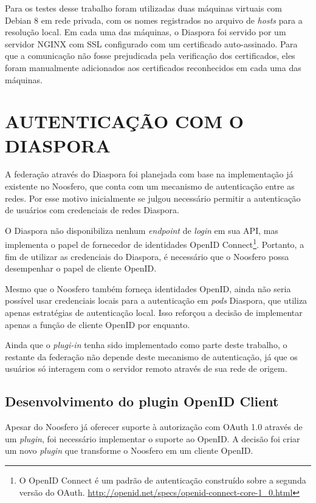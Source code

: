 \begin{apendicesenv}
Para os testes desse trabalho foram utilizadas duas máquinas virtuais com Debian 8
em rede privada, com os nomes registrados no arquivo de \textit{hosts} para a
resolução local. Em cada uma das máquinas, o Diaspora foi servido por um servidor
NGINX com SSL configurado com um certificado auto-assinado. Para que a comunicação
não fosse prejudicada pela verificação dos certificados, eles foram manualmente
adicionados aos certificados reconhecidos em cada uma das máquinas.

\section{AUTENTICAÇÃO COM O DIASPORA}

A federação através do Diaspora foi planejada com base na implementação já existente
no Noosfero, que conta com um mecanismo de autenticação entre as redes. Por esse
motivo inicialmente se julgou necessário permitir a autenticação de usuários com
credenciais de redes Diaspora.

O Diaspora não disponibiliza nenhum \textit{endpoint} de \textit{login} em sua API,
mas implementa o papel de fornecedor de identidades OpenID Connect\footnote{O OpenID
Connect é um padrão de autenticação construído sobre a segunda versão do OAuth.
\url{http://openid.net/specs/openid-connect-core-1_0.html}}. Portanto, a fim de
utilizar as credenciais do Diaspora, é necessário que o Noosfero possa desempenhar o
papel de cliente OpenID.

Mesmo que o Noosfero também forneça identidades OpenID, ainda não seria possível
usar credenciais locais para a autenticação em \textit{pods} Diaspora, que utiliza
apenas estratégias de autenticação local. Isso reforçou a decisão de implementar
apenas a função de cliente OpenID por enquanto.

Ainda que o \textit{plugi-in} tenha sido implementado como parte deste trabalho, o
restante da federação não depende deste mecanismo de autenticação, já que os
usuários só interagem com o servidor remoto através de sua rede de origem.

\subsection{Desenvolvimento do plugin OpenID Client}

Apesar do Noosfero já oferecer suporte à autorização com OAuth 1.0 através de um
\textit{plugin}, foi necessário implementar o suporte ao OpenID. A decisão foi criar
um novo \textit{plugin} que transforme o Noosfero em um cliente OpenID.


\end{apendicesenv}
